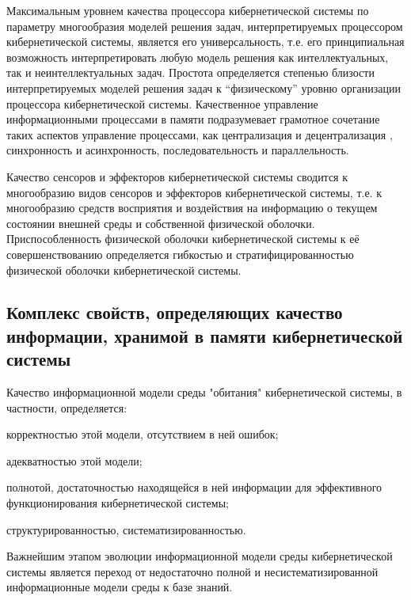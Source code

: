 Максимальным уровнем качества процессора кибернетической системы по параметру многообразия моделей решения задач, интерпретируемых процессором кибернетической системы, является его универсальность, т.е. его принципиальная возможность интерпретировать любую модель решения как интеллектуальных, так и неинтеллектуальных задач. 
Простота определяется степенью близости интерпретируемых моделей решения задач к “физическому” уровню организации процессора кибернетической системы. 
Качественное управление информационными процессами в памяти подразумевает грамотное сочетание таких аспектов управление процессами, как централизация и децентрализация , синхронность и асинхронность, последовательность и параллельность.

Качество сенсоров и эффекторов кибернетической системы сводится к многообразию видов сенсоров и эффекторов кибернетической системы, т.е. к многообразию средств восприятия и воздействия на информацию о текущем состоянии внешней среды и собственной физической оболочки.
Приспособленность физической оболочки кибернетической системы к её совершенствованию определяется гибкостью и стратифицированностью физической оболочки кибернетической системы.



\subsection{Комплекс свойств, определяющих качество информации, хранимой в памяти кибернетической системы}
{\label{sec_cyb_syst_information_quality}} 

Качество информационной модели среды "обитания"{} кибернетической системы, в частности, определяется:
\begin{textitemize}
    \item корректностью этой модели, отсутствием в ней ошибок;
    \item адекватностью этой модели;
    \item полнотой, достаточностью находящейся в ней информации для эффективного функционирования кибернетической системы;
    \item структурированностью, систематизированностью.
\end{textitemize}

Важнейшим этапом эволюции информационной модели среды кибернетической системы является переход от недостаточно полной и несистематизированной информационные модели среды к базе знаний.

